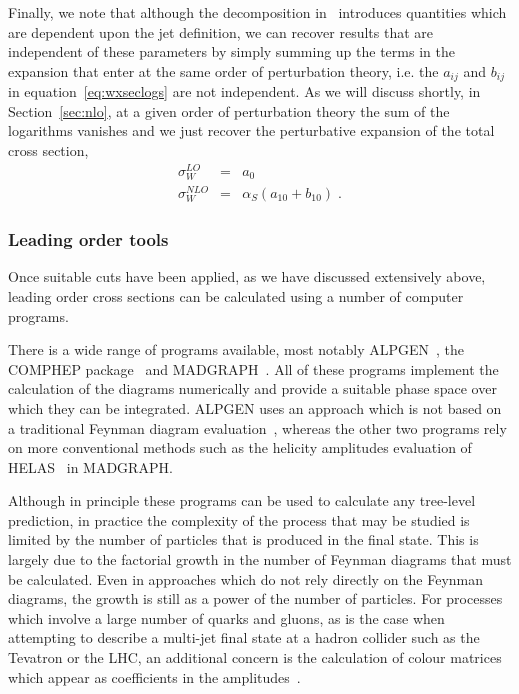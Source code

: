 \documentclass[12pt]{iopart}
\def\as{\alpha_S}
\begin{document}
Finally, we note that although the decomposition in~
introduces quantities which are dependent upon the jet definition, we can recover
results that are independent of these parameters by simply summing up the
terms in the expansion that enter at the same order of perturbation theory, i.e.
the $a_{ij}$ and $b_{ij}$ in equation~\ref{eq:wxseclogs} are not independent.
As we will discuss shortly, in Section~\ref{sec:nlo}, at a given order of
perturbation theory the sum of the logarithms vanishes and we just recover
the perturbative expansion of the total cross section,
\begin{eqnarray*}
\sigma_W^{LO} & = & a_0 \nonumber \\
\sigma_W^{NLO} & = & \as \left( a_{10}+b_{10} \right) \; .
\end{eqnarray*} 


\subsubsection{Leading order tools}
\label{sec:LOtools}

Once suitable cuts have been applied, as we have discussed extensively above, leading order cross
sections can be calculated using a number of computer programs.

There is a wide range of programs available, most notably
ALPGEN~\cite{Mangano:2001xp,Mangano:2002ea},
the COMPHEP package~\cite{Pukhov:1999gg,Boos:2004kh} and
MADGRAPH~\cite{Stelzer:1994ta,Maltoni:2002qb}.
All of these programs implement the calculation of the diagrams
numerically and provide a suitable phase space over which they can
be integrated. ALPGEN uses an approach which is not based on a traditional
Feynman diagram evaluation~\cite{Caravaglios:1998yr}, whereas the other two
programs rely on more conventional methods such as the helicity amplitudes
evaluation of HELAS~\cite{Murayama:1992gi} in MADGRAPH.

Although in principle these programs can be used to calculate any
tree-level prediction, in practice the complexity of the process that may
be studied is limited by the number of particles that is produced in the
final state. This is largely due to the factorial growth in the number of
Feynman diagrams that must be calculated. Even in approaches which do
not rely directly on the Feynman diagrams, the growth is still as a power
of the number of particles. For processes which involve a
large number of quarks and gluons, as is the case when attempting
to describe a multi-jet final state at a hadron collider such as the Tevatron
or the LHC, an additional concern is the calculation of colour matrices
which appear as coefficients in the amplitudes~\cite{Maltoni:2002mq}.
\end{document}
